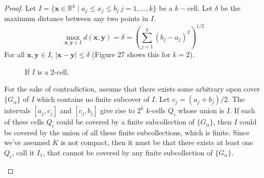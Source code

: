 \documentclass{article}
\newcommand{\R}{\mathbb{R}}
\newcommand{\x}{\mathbf{x}}
\newcommand{\y}{\mathbf{y}}
\theoremstyle{definition}
\begin{document}
	\begin{proof}
		Let $ I=\{\x\in\R^k\mid a_j\le x_j\le b_j\ j=1,\ldots,k\} $ be a $ k- $cell. Let $ \delta $ be the maximum distance between any two points in $ I $.
		$$ \max\limits_{\x,\y\in I}d(\x,\y)=\delta=\left(\sum_{j=1}^k(b_j-a_j)^2\right)^{1/2}$$
		For all $ \x,\y\in I $, $ |\x-\y|\le\delta $ (Figure 27 shows this for $ k=2 $). 
		\begin{figure}[h!]
			\centering
			\caption{If $ I $ is a 2-cell.}
		\end{figure}
		
		For the sake of contradiction, assume that there exists some arbitrary open cover $ \{G_\alpha\} $ of $ I $ which contains no finite subcover of $ I $. Let $ c_j=(a_j+b_j)/2 $. The intervals $ [a_j,c_j] $ and $ [c_j,b_j] $ give rise to $ 2^k $ $ k $-cells $ Q_i $ whose union is $ I $. If each of these cells $ Q_i $ could be covered by a finite subcollection of $ \{G_\alpha\} $, then $ I $ could be covered by the union of all these finite subcollections, which is finite. Since we've assumed $ K $ is not compact, then it must be that there exists at least one $ Q_i $, call it $ I_1 $, that cannot be covered by any finite subcollection of $ \{G_\alpha\} $.  
		\begin{figure}[h!]
			\centering
			\begin{tikzpicture}
				

\end{tikzpicture}
\end{figure}
\end{proof}
\end{document}
